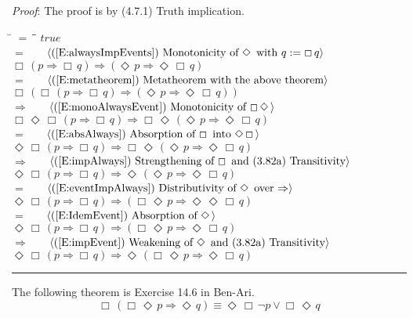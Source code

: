 \documentclass[12pt, fleqn, leqno]{article}
\newcommand{\lgap}{2pt}                             %
\newcommand{\mymathindent}{24pt}                    %
\newcommand{\impl}{\ensuremath{\Rightarrow}}        %
\newcommand{\Event}{\Diamond\,}
\newcommand{\Always}{\Box\,}
\newcommand{\myqed}{\rule[-.23ex]{1.2ex}{2.0ex}}
\newcommand{\myqedtab}{\hspace{384pt}}              %
\newcommand{\Gll} {\langle}                         %
\newcommand{\Ggg} {\rangle}                         %
\newcommand{\Hint}[1]     {\ \ \ $\Gll              \mbox{#1} \Ggg$ }   %
\begin{document}
\emph{Proof}: The proof is by (4.7.1) Truth implication.
\begin{tabbing}
\hspace{\mymathindent} \= $= \;$ \= \myqedtab \= \kill
  \> \>   $true$\\[\lgap]
  \> $=$  \>  \Hint{(\ref{E:alwaysImpEvents}) Monotonicity of $\Event$ with $q:=\Always q$}\\[\lgap]
  \> \>   $\Always (p \impl \Always q) \impl (\Event p \impl \Event\Always q)$\\[\lgap]
  \> $=$ \> \Hint{(\ref{E:metatheorem}) Metatheorem with the above theorem}\\[\lgap]
  \> \>   $\Always(\Always (p \impl \Always q) \impl (\Event p \impl \Event\Always q))$\\[\lgap]
  \> $\impl$ \> \Hint{(\ref{E:monoAlwaysEvent}) Monotonicity of $\Always\Event$}\\[\lgap]
  \> \>   $\Always\Event\Always (p \impl \Always q) \impl \Always\Event(\Event p \impl \Event\Always q)$\\[\lgap]
  \> $=$  \>  \Hint{(\ref{E:absAlways}) Absorption of $\Always$ into $\Event\Always$}\\[\lgap]
  \> \>   $\Event\Always (p \impl \Always q) \impl \Always\Event(\Event p \impl \Event\Always q)$\\[\lgap]
  \> $\impl$  \>  \Hint{(\ref{E:impAlways}) Strengthening of $\Always$ and (3.82a) Transitivity}\\[\lgap]
  \> \>   $\Event\Always (p \impl \Always q) \impl \Event(\Event p \impl \Event\Always q)$\\[\lgap]
  \> $=$  \>  \Hint{(\ref{E:eventImpAlways}) Distributivity of $\Event$ over $\impl$}\\[\lgap]
  \> \>   $\Event\Always (p \impl \Always q) \impl (\Always\Event p \impl \Event\Event\Always q)$\\[\lgap]
  \> $=$  \>  \Hint{(\ref{E:IdemEvent}) Absorption of $\Event$}\\[\lgap]
  \> \>   $\Event\Always (p \impl \Always q) \impl (\Always\Event p \impl \Event\Always q)$\\[\lgap]
      \> $\impl$  \> \Hint{(\ref{E:impEvent}) Weakening of $\Event$ and (3.82a) Transitivity}\\[\lgap]
  \> \>   $\Event\Always (p \impl \Always q) \impl \Event(\Always\Event p \impl \Event\Always q)$ \quad \myqed
\end{tabbing}

The following theorem is Exercise 14.6 in Ben-Ari. \cite{Ben}
\begin{equation}\label{E:BenAriequiv1}
\Always (\Always\Event p \impl \Event q) \equiv \Event\Always\neg p \lor \Always\Event q
\end{equation}
\end{document}
